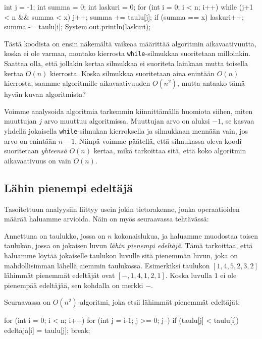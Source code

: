 \begin{code}
int j = -1;
int summa = 0;
int laskuri = 0;
for (int i = 0; i < n; i++) {
    while (j+1 < n && summa < x) {
        j++;
        summa += taulu[j];
    }
    if (summa == x) laskuri++;
    summa -= taulu[i];
}
System.out.println(laskuri);
\end{code}

Tästä koodista on ensin näkemältä vaikeaa määrittää algoritmin
aikavaativuutta, koska ei ole varmaa, montako kierrosta
\texttt{while}-silmukkaa suoritetaan milloinkin.
Saattaa olla, että jollakin kertaa silmukkaa ei suoriteta lainkaan
mutta toisella kertaa $O(n)$ kierrosta.
Koska silmukkaa suoritetaan aina enintään $O(n)$ kierrosta,
saamme algoritmille aikavaativuuden $O(n^2)$,
mutta antaako tämä hyvän kuvan algoritmista?

Voimme analysoida algoritmia tarkemmin kiinnittämällä huomiota
siihen, miten muuttujan $j$ arvo muuttuu algoritmissa.
Muuttujan arvo on aluksi $-1$,
se kasvaa yhdellä jokaisella \texttt{while}-silmukan kierroksella
ja silmukkaan mennään vain, jos arvo on enintään $n-1$.
Niinpä voimme päätellä, että silmukassa oleva koodi suoritetaan \emph{yhteensä}
$O(n)$ kertaa, mikä tarkoittaa sitä,
että koko algoritmin aikavaativuus on vain $O(n)$.

\subsection{Lähin pienempi edeltäjä}

Tasoitettuun analyysiin liittyy usein jokin tietorakenne,
jonka operaatioiden määrää haluamme arvioida.
Näin on myös seuraavassa tehtävässä:

Annettuna on taulukko, jossa on $n$ kokonaislukua,
ja haluamme muodostaa toisen taulukon,
jossa on jokaisen luvun \emph{lähin pienempi edeltäjä}.
Tämä tarkoittaa, että haluamme löytää jokaiselle taulukon luvulle
sitä pienemmän luvun, joka on mahdollisimman lähellä aiemmin taulukossa.
Esimerkiksi taulukon $[1,4,5,2,3,2]$
lähimmät pienemmät edeltäjät ovat $[-,1,4,1,2,1]$.
Koska luvulla $1$ ei ole pienempää edeltäjää,
sen kohdalla on merkki $-$.

Seuraavassa on $O(n^2)$-algoritmi, joka etsii
lähimmät pienemmät edeltäjät:

\begin{code}
for (int i = 0; i < n; i++) {
    for (int j = i-1; j >= 0; j--) {
        if (taulu[j] < taulu[i]) {
            edeltaja[i] = taulu[j];
            break;
        }
    }
}
\end{code}

